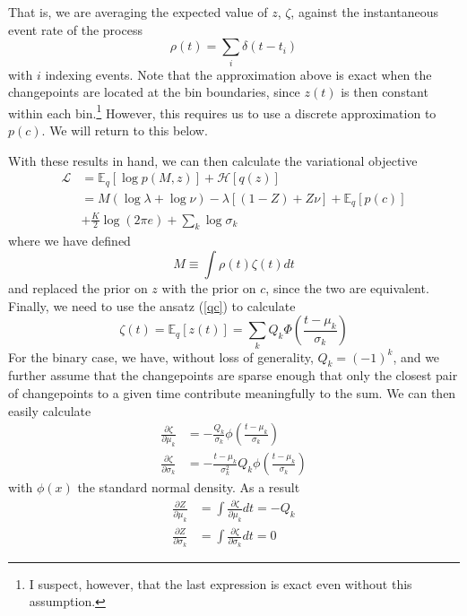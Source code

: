 \documentclass[11pt]{article}
\begin{document}
That is, we are averaging the expected value of $z$, $\zeta$, against the instantaneous event rate of the process
\begin{equation}
    \rho(t) = \sum_i \delta(t - t_i)
\end{equation}
with $i$ indexing events. Note that the approximation above is exact when the changepoints are located at the bin boundaries, since $z(t)$ is then constant within each bin.\footnote{I suspect, however, that the last expression is exact even without this assumption.} However, this requires us to use a discrete approximation to $p(c)$. We will return to this below.

With these results in hand, we can then calculate the variational objective
\begin{align}
    \mathcal{L} &= \mathbb{E}_q [\log p(M, z)] + \mathcal{H}[q(z)] \\
    &= M (\log \lambda + \log \nu) - \lambda [(1 - Z) + Z\nu] + \mathbb{E}_q[p(c)] \\
    &+ \frac{K}{2}\log(2\pi e) + \sum_k \log \sigma_k
\end{align}
where we have defined
\begin{equation}
    M \equiv \int \rho(t) \zeta(t) dt
\end{equation}
and replaced the prior on $z$ with the prior on $c$, since the two are equivalent. Finally, we need to use the ansatz (\ref{qc}) to calculate
\begin{equation}
    \zeta(t) = \mathbb{E}_q[z(t)] = \sum_k Q_k \Phi\left(\frac{t - \mu_k}{\sigma_k} \right)
\end{equation}
For the binary case, we have, without loss of generality, $Q_k = (-1)^k$, and we further assume that the changepoints are sparse enough that only the closest pair of changepoints to a given time contribute meaningfully to the sum. We can then easily calculate
\begin{align}
    \frac{\partial \zeta}{\partial \mu_k} &= -\frac{Q_k}{\sigma_k}\phi\left( \frac{t - \mu_k}{\sigma_k}\right) \\
    \frac{\partial \zeta}{\partial \sigma_k} &= -\frac{t - \mu_k}{\sigma_k^2} Q_k\phi\left( \frac{t - \mu_k}{\sigma_k}\right)
\end{align}
with $\phi(x)$ the standard normal density. As a result
\begin{align}
    \frac{\partial Z}{\partial \mu_k} &= \int \frac{\partial \zeta}{\partial \mu_k} dt = -Q_k \\
    \frac{\partial Z}{\partial \sigma_k} &= \int \frac{\partial \zeta}{\partial \sigma_k} dt = 0
\end{align}
\end{document}
